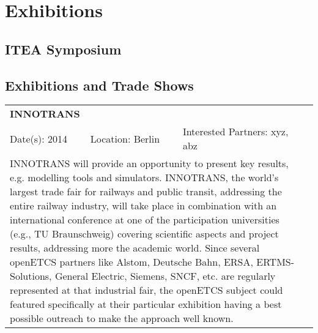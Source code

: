 ﻿\section{Exhibitions}

\subsection{ITEA Symposium}

\subsection{Exhibitions and Trade Shows}

\renewcommand{\tableentry}[5]{\multicolumn{3}{|l|}{\textbf{#1}}\\Date(s): #2&Location: #3&Interested Partners: #4\\\multicolumn{3}{|p{\textwidth}|}{#5}\\\hline}

\begin{longtable}{|llll|}
 \hline
 \tableentry{INNOTRANS}{2014}{Berlin}{xyz, abz}{
	INNOTRANS will provide an opportunity to present key results, e.g. modelling tools and simulators. INNOTRANS, the world's largest trade fair for railways and public transit, addressing the entire railway industry, will take place in combination with an international conference at one of the participation universities (e.g., TU Braunschweig) covering scientific aspects and project results, addressing more the academic world. Since several openETCS partners like Alstom, Deutsche Bahn, ERSA, ERTMS-Solutions, General Electric, Siemens, SNCF, etc. are regularly represented at that industrial fair, the openETCS subject could featured specifically at their particular exhibition having a best possible outreach to make the approach well known.
 }
\end{longtable}



